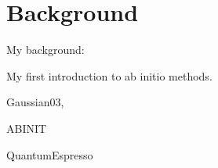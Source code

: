 \section{Background}

My background:

My first introduction to ab initio methods.

Gaussian03,

ABINIT

QuantumEspresso
